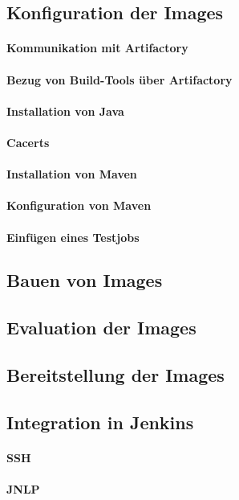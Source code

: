 \subsection{Konfiguration der Images}

\paragraph{Kommunikation mit Artifactory}

\paragraph{Bezug von Build-Tools über Artifactory}

\paragraph{Installation von Java}

\paragraph{Cacerts}

\paragraph{Installation von Maven}

\paragraph{Konfiguration von Maven}

\paragraph{Einfügen eines Testjobs}

\subsection{Bauen von Images}

\subsection{Evaluation der Images}

\subsection{Bereitstellung der Images}

\subsection{Integration in Jenkins}

\paragraph{SSH}

\paragraph{JNLP}
